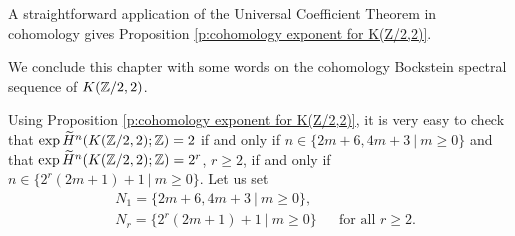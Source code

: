 A straightforward application of the Universal Coefficient Theorem in cohomology gives Proposition \ref{p:cohomology exponent for K(Z/2,2)}. 

\newpage
\begin{prop_heuristic_coH}

\end{prop_heuristic_coH}

We conclude this chapter with some words on the cohomology Bockstein spectral sequence of $K(\mathbb{Z}/2,2)$.

\medskip
Using Proposition \ref{p:cohomology exponent for K(Z/2,2)}, it is very easy to check that $\exp\widetilde{H}^n(K(\mathbb{Z}/2,2);\mathbb{Z})=2$ if and only if $n\in\{2m+6,4m+3\ |\ m\geq0\}$ and that $\exp\widetilde{H}^n(K(\mathbb{Z}/2,2);\mathbb{Z})=2^r$, $r\geq2$, if and only if $n\in\{2^r(2m+1)+1\ |\ m\geq0\}$. Let us set
\begin{align*}
&N_1=\{2m+6,4m+3\ |\ m\geq0\},\\
&N_r=\{2^r(2m+1)+1\ |\ m\geq0\} &&\text{for all $r\geq2$.}
\end{align*}

